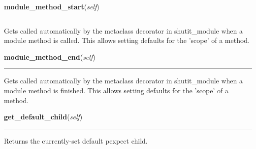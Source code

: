     \label{shutit_global:ShutIt:module_method_start}

    \vspace{0.5ex}

\hspace{.8\funcindent}\begin{boxedminipage}{\funcwidth}

    \raggedright \textbf{module\_method\_start}(\textit{self})

    \vspace{-1.5ex}

    \rule{\textwidth}{0.5\fboxrule}
\setlength{\parskip}{2ex}
    Gets called automatically by the metaclass decorator in shutit\_module 
    when a module method is called. This allows setting defaults for the 
    'scope' of a method.

\setlength{\parskip}{1ex}
    \end{boxedminipage}

    \label{shutit_global:ShutIt:module_method_end}

    \vspace{0.5ex}

\hspace{.8\funcindent}\begin{boxedminipage}{\funcwidth}

    \raggedright \textbf{module\_method\_end}(\textit{self})

    \vspace{-1.5ex}

    \rule{\textwidth}{0.5\fboxrule}
\setlength{\parskip}{2ex}
    Gets called automatically by the metaclass decorator in shutit\_module 
    when a module method is finished. This allows setting defaults for the 
    'scope' of a method.

\setlength{\parskip}{1ex}
    \end{boxedminipage}

    \label{shutit_global:ShutIt:get_default_child}

    \vspace{0.5ex}

\hspace{.8\funcindent}\begin{boxedminipage}{\funcwidth}

    \raggedright \textbf{get\_default\_child}(\textit{self})

    \vspace{-1.5ex}

    \rule{\textwidth}{0.5\fboxrule}
\setlength{\parskip}{2ex}
    Returns the currently-set default pexpect child.

\setlength{\parskip}{1ex}
    \end{boxedminipage}

